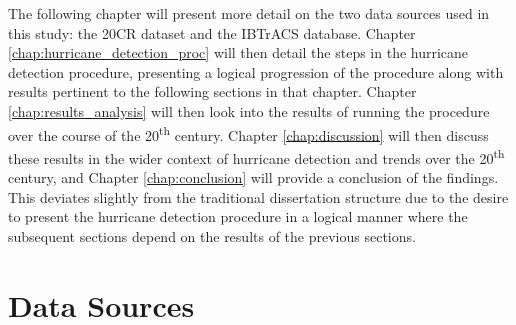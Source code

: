 \documentclass[pdftex,12pt,a4paper]{report}
\newcommand{\ts}{\textsuperscript}
\begin{document}

The following chapter will present more detail on the two data sources used in this study: the 20CR
dataset and the IBTrACS database. Chapter \ref{chap:hurricane_detection_proc} will then detail the
steps in the hurricane detection procedure, presenting a logical progression of the procedure along
with results pertinent to the following sections in that chapter. Chapter
\ref{chap:results_analysis} will then look into the results of running the procedure over the course
of the 20\ts{th} century.  Chapter \ref{chap:discussion} will then discuss these results in the
wider context of hurricane detection and trends over the 20\ts{th} century, and Chapter
\ref{chap:conclusion} will provide a conclusion of the findings. This deviates slightly
from the traditional dissertation structure due to the desire to present the hurricane detection
procedure in a logical manner where the subsequent sections depend on the results of the previous
sections.

\chapter{Data Sources}
\end{document}
